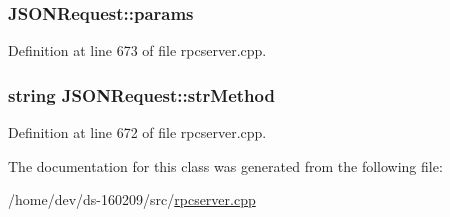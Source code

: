 \hypertarget{class_j_s_o_n_request_a92b1bcc9caa57cec01ccdb498a2b3666}{}
\subsubsection[{params}]{ J\+S\+O\+N\+Request\+::params}\label{class_j_s_o_n_request_a92b1bcc9caa57cec01ccdb498a2b3666}


Definition at line 673 of file rpcserver.\+cpp.

\hypertarget{class_j_s_o_n_request_ace58495b259be69fb4b6e256a42c9d5f}{}
\subsubsection[{str\+Method}]{\setlength{\rightskip}{0pt plus 5cm}string J\+S\+O\+N\+Request\+::str\+Method}\label{class_j_s_o_n_request_ace58495b259be69fb4b6e256a42c9d5f}


Definition at line 672 of file rpcserver.\+cpp.



The documentation for this class was generated from the following file\+:\begin{DoxyCompactItemize}
\item 
/home/dev/ds-\/160209/src/\hyperlink{rpcserver_8cpp}{rpcserver.\+cpp}\end{DoxyCompactItemize}
